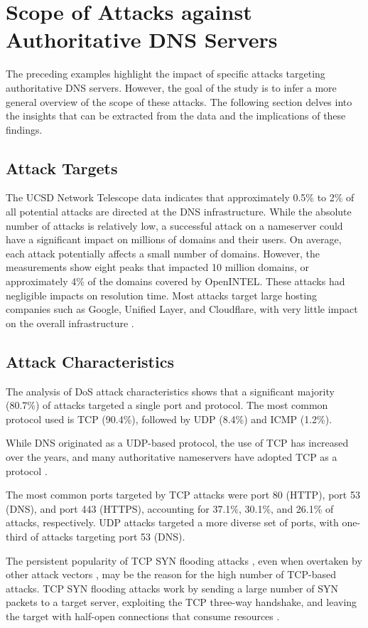 \section{Scope of Attacks against Authoritative DNS Servers} \label{sec:scopeofattacksagainstauthoritativednsservers}
The preceding examples highlight the impact of specific attacks targeting authoritative DNS servers.
However, the goal of the study is to infer a more general overview of the scope of these attacks.
The following section delves into the insights that can be extracted from the data and the implications of these findings.
\subsection{Attack Targets}
The UCSD Network Telescope data indicates that approximately 0.5\% to 2\% of all potential attacks are directed at the DNS infrastructure.
While the absolute number of attacks is relatively low, a successful attack on a nameserver could have a significant impact on millions of domains and their users.
On average, each attack potentially affects a small number of domains.
However, the measurements show eight peaks that impacted 10 million domains, or approximately 4\% of the domains covered by OpenINTEL.
These attacks had negligible impacts on resolution time.
Most attacks target large hosting companies such as Google, Unified Layer, and Cloudflare, with very little impact on the overall infrastructure \cite{Sommese2022DDoSDNS}.


\subsection{Attack Characteristics}
The analysis of \ac{DoS} attack characteristics shows that a significant majority (80.7\%) of attacks targeted a single port and protocol. The most common protocol used is TCP (90.4\%), followed by UDP (8.4\%) and ICMP (1.2\%).

While DNS originated as a UDP-based protocol, the use of TCP has increased over the years, and many authoritative nameservers have adopted TCP as a protocol \cite{Mao2022AssessingSF}.

The most common ports targeted by TCP attacks were port 80 (HTTP), port 53 (DNS), and port 443 (HTTPS), accounting for 37.1\%, 30.1\%, and 26.1\% of attacks, respectively.
UDP attacks targeted a more diverse set of ports, with one-third of attacks targeting port 53 (DNS).

The persistent popularity of TCP SYN flooding attacks \cite{cloudflareddosreport2022} \cite{netscoutdirectpath}, even when overtaken by other attack vectors \cite{cloudflareddosreport2023q1} \cite{cloudflareddosreport2023q2}, may be the reason for the high number of TCP-based attacks.
TCP SYN flooding attacks work by sending a large number of SYN packets to a target server, exploiting the TCP three-way handshake, and leaving the target with half-open connections that consume resources \cite[688-690]{Stallings_William2022-06-06}.

